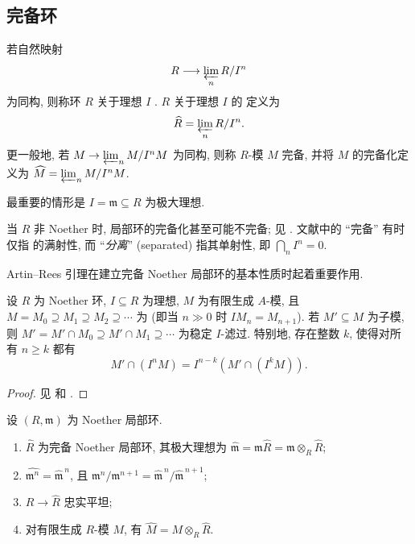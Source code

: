 \subsection{完备环}\label{src:B.5.1-subsection}
\begin{definition}\label{src:B.5.1}
若自然映射
\begin{equation}\label{src:B.5.2}
R\longrightarrow\varprojlim_n R/I^n
\end{equation}
为同构, 则称环 $R$ 关于理想 $I$ . $R$ 关于理想 $I$ 的 定义为
\[
\widehat R=\varprojlim_n R/I^n.
\]
更一般地, 若 $M\to\varprojlim_n M/I^nM$ 为同构, 则称 $R$-模 $M$ 完备, 并将 $M$ 的完备化定义为 $\widehat M=\varprojlim_n M/I^nM$.
\end{definition}
最重要的情形是 $I=\mathfrak m\subseteq R$ 为极大理想.
\begin{caution}\label{src:B.5.3}
当 $R$ 非 Noether 时, 局部环的完备化甚至可能不完备; 见 \cite[Tag 05JC]{SP}. 文献中的 ``完备'' 有时仅指  的满射性, 而 ``\textit{分离}'' (\textup{separated}) 指其单射性, 即 $\bigcap_n I^n=0$.
\end{caution}
Artin--Rees 引理在建立完备 Noether 局部环的基本性质时起着重要作用.
\begin{lemma}\label{src:B.5.4}
设 $R$ 为 Noether 环, $I\subseteq R$ 为理想, $M$ 为有限生成 $A$-模, 且 $M=M_0\supseteq M_1\supseteq M_2\supseteq\cdots$ 为 (即当 $n\gg0$ 时 $IM_n=M_{n+1}$). 若 $M'\subseteq M$ 为子模, 则 $M'=M'\cap M_0\supseteq M'\cap M_1\supseteq\cdots$ 为稳定 $I$-滤过. 特别地, 存在整数 $k$, 使得对所有 $n\geq k$ 都有
\[
M'\cap(I^nM)=I^{n-k}(M'\cap(I^kM)).
\]
\end{lemma}
\begin{proof}
见 \cite[命题 $10.9$ 及推论 $10.10$]{AM69} 和 \cite[引理 $5.1$]{Eis95}.
\end{proof}
\begin{proposition}\label{src:B.5.5}
设 $(R,\mathfrak m)$ 为 Noether 局部环.
\begin{enumerate}[(1)]
\item $\widehat R$ 为完备 Noether 局部环, 其极大理想为 $\widehat{\mathfrak m}=\mathfrak m\widehat R=\mathfrak m\otimes_R\widehat R$;
\item $\widehat{\mathfrak m^n}=\widehat{\mathfrak m}^{\,n}$, 且 $\mathfrak m^n/\mathfrak m^{n+1}=\widehat{\mathfrak m}^{\,n}/\widehat{\mathfrak m}^{\,n+1}$;
\item $R\to\widehat R$ 忠实平坦;
\item 对有限生成 $R$-模 $M$, 有 $\widehat M=M\otimes_R\widehat R$.
\end{enumerate}
\end{proposition}

